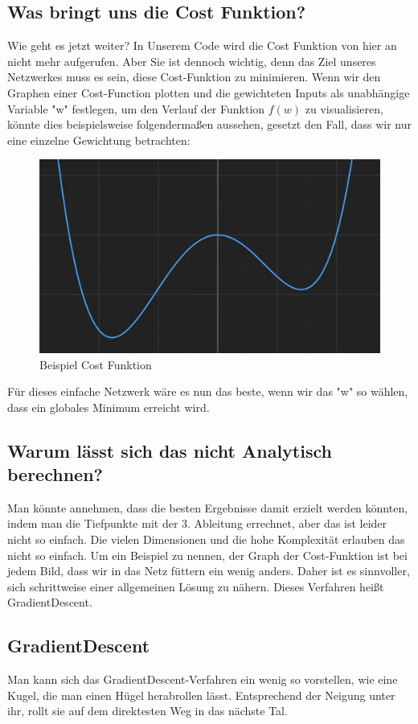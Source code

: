 \documentclass[12pt]{article}
\begin{document}
\subsection{Was bringt uns die Cost Funktion?}Wie geht es jetzt weiter? In Unserem Code wird die Cost Funktion von hier an nicht mehr aufgerufen. Aber Sie ist dennoch wichtig, denn das Ziel unseres Netzwerkes muss es sein, diese Cost-Funktion zu minimieren. Wenn wir den Graphen einer Cost-Function plotten und die gewichteten Inputs als unabhängige Variable "w" festlegen, um den Verlauf der Funktion $f(w)$ zu visualisieren, könnte dies beispielsweise folgendermaßen aussehen, gesetzt den Fall, dass wir nur eine einzelne Gewichtung betrachten:
\begin{figure}[H]
\centering
\includegraphics[scale=0.30]{./Images/Pasted image 20230914193809.png}
\caption{Beispiel Cost Funktion}
\label{Beispiel Cost Funktion}
\end{figure}Für dieses einfache Netzwerk wäre es nun das beste, wenn wir das "w" so wählen, dass ein globales Minimum erreicht wird. \subsection{Warum lässt sich das nicht Analytisch berechnen?}Man könnte annehmen, dass die besten Ergebnisse damit erzielt werden könnten, indem man die Tiefpunkte mit der 3. Ableitung errechnet, aber das ist leider nicht so einfach.
Die vielen Dimensionen und die hohe Komplexität erlauben das nicht so einfach. Um ein Beispiel zu nennen, der Graph der Cost-Funktion ist bei jedem Bild, dass wir in das Netz füttern ein wenig anders. Daher ist es sinnvoller, sich schrittweise einer allgemeinen Lösung zu nähern. Dieses Verfahren heißt GradientDescent. \subsection{GradientDescent}Man kann sich das GradientDescent-Verfahren ein wenig so vorstellen, wie eine Kugel, die man einen Hügel herabrollen lässt. Entsprechend der Neigung unter ihr, rollt sie auf dem direktesten Weg in das nächste Tal. 
\end{document}
